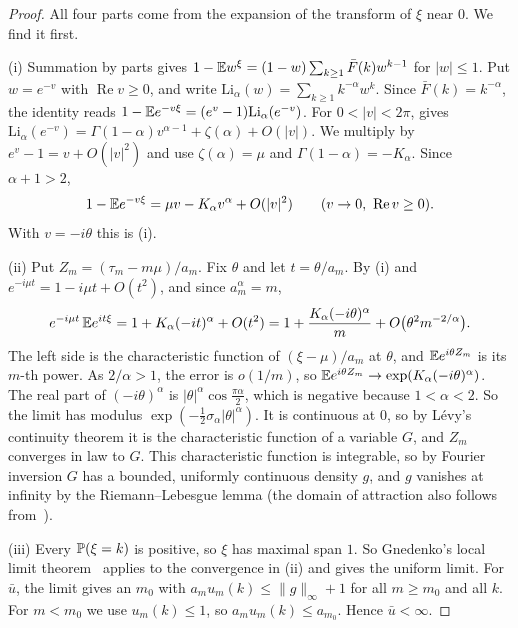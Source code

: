 \begin{proof}
All four parts come from the expansion of the transform of $\xi$ near $0$. We
find it first.

(i) Summation by parts gives $1-\mathbb{E} w^\xi=(1-w)\sum_{k\ge1}\bar F(k)w^{k-1}$
for $\lvert w\rvert\le1$. Put $w=e^{-v}$ with $\operatorname{Re}v\ge0$, and
write $\mathrm{Li}_\alpha(w)=\sum_{k\ge1}k^{-\alpha}w^k$. Since
$\bar F(k)=k^{-\alpha}$, the identity reads
$1-\mathbb{E} e^{-v\xi}=(e^v-1)\mathrm{Li}_\alpha(e^{-v})$. For
$0<\lvert v\rvert<2\pi$, \cite[25.12.12]{dlmf} gives
$\mathrm{Li}_\alpha(e^{-v})=\Gamma(1-\alpha)v^{\alpha-1}+\zeta(\alpha)+O(\lvert
v\rvert)$. We multiply by $e^v-1=v+O(\lvert v\rvert^2)$ and use
$\zeta(\alpha)=\mu$ and $\Gamma(1-\alpha)=-K_\alpha$. Since $\alpha+1>2$,
\[
 1-\mathbb{E} e^{-v\xi}=\mu v-K_\alpha v^\alpha+O(\lvert v\rvert^2)
 \qquad(v\to0,\ \operatorname{Re}v\ge0).
\]
With $v=-i\theta$ this is (i).

(ii) Put $Z_m=(\tau_m-m\mu)/a_m$. Fix $\theta$ and let $t=\theta/a_m$. By (i)
and $e^{-i\mu t}=1-i\mu t+O(t^2)$, and since $a_m^\alpha=m$,
\[
 e^{-i\mu t}\,\mathbb{E} e^{it\xi}=1+K_\alpha(-it)^\alpha+O(t^2)
 =1+\frac{K_\alpha(-i\theta)^\alpha}m+O\bigl(\theta^2m^{-2/\alpha}\bigr).
\]
The left side is the characteristic function of $(\xi-\mu)/a_m$ at $\theta$,
and $\mathbb{E} e^{i\theta Z_m}$ is its $m$-th power. As $2/\alpha>1$, the error is
$o(1/m)$, so $\mathbb{E} e^{i\theta Z_m}\to\exp(K_\alpha(-i\theta)^\alpha)$. The
real part of $(-i\theta)^\alpha$ is
$\lvert\theta\rvert^\alpha\cos\frac{\pi\alpha}2$, which is negative because
$1<\alpha<2$. So the limit has modulus
$\exp(-\frac12\sigma_\alpha\lvert\theta\rvert^\alpha)$. It is continuous at
$0$, so by L\'evy's continuity theorem it is the characteristic function of a
variable $G$, and $Z_m$ converges in law to $G$. This characteristic function is integrable, so by
Fourier inversion $G$ has a bounded, uniformly continuous density $g$, and
$g$ vanishes at infinity by the Riemann--Lebesgue lemma (the domain of
attraction also follows from~\cite[Section~XVII.5]{feller1971}).

(iii) Every $\mathbb{P}(\xi=k)$ is positive, so $\xi$ has maximal span $1$. So
Gnedenko's local limit theorem~\cite[Theorem~4.2.1]{ibragimovlinnik1971} applies
to the convergence in (ii) and gives the uniform limit. For $\bar u$, the
limit gives an $m_0$ with $a_mu_m(k)\le\lVert g\rVert_\infty+1$ for all
$m\ge m_0$ and all $k$. For $m<m_0$ we use $u_m(k)\le1$, so
$a_mu_m(k)\le a_{m_0}$. Hence $\bar u<\infty$.


\end{proof}
